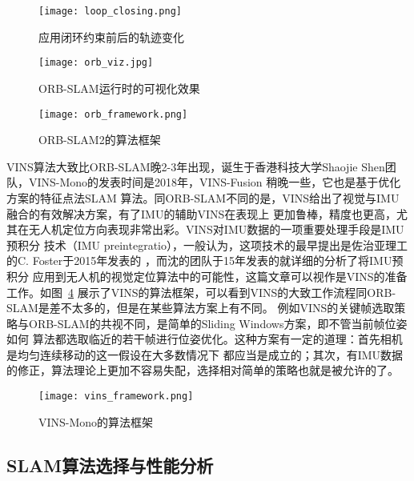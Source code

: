 \begin{figure}[h] %
  \centering
  \texttt{[image: loop\_closing.png]}
  \caption{应用闭环约束前后的轨迹变化}
  \label{fig:loop_closing}
\end{figure}


\begin{figure}[h] %
  \centering
  \texttt{[image: orb\_viz.jpg]}
  \caption{ORB-SLAM运行时的可视化效果}
  \label{fig:orb_viz}
\end{figure}

\begin{figure}[h] %
  \centering
  \texttt{[image: orb\_framework.png]}
  \caption{ORB-SLAM2的算法框架}
  \label{fig:orb_frame}
\end{figure}




VINS\cite{qin2018vins}算法大致比ORB-SLAM晚2-3年出现，诞生于香港科技大学Shaojie Shen团队，VINS-Mono的发表时间是2018年，VINS-Fusion
稍晚一些，它也是基于优化方案的特征点法SLAM
算法。同ORB-SLAM不同的是，VINS给出了视觉与IMU融合的有效解决方案，有了IMU的辅助VINS在表现上
更加鲁棒，精度也更高，尤其在无人机定位方向表现非常出彩。VINS对IMU数据的一项重要处理手段是IMU预积分
技术（IMU preintegratio），一般认为，这项技术的最早提出是佐治亚理工的C. Foster于2015年发表的
\cite{forster2015imu}，而沈的团队于15年发表的\cite{shen2015tightly}就详细的分析了将IMU预积分
应用到无人机的视觉定位算法中的可能性，这篇文章可以视作是VINS的准备工作。如图~\ref{fig:vins_frame}
展示了VINS的算法框架，可以看到VINS的大致工作流程同ORB-SLAM是差不太多的，但是在某些算法方案上有不同。
例如VINS的关键帧选取策略与ORB-SLAM的共视不同，是简单的Sliding Windows方案，即不管当前帧位姿如何
算法都选取临近的若干帧进行位姿优化。这种方案有一定的道理：首先相机是均匀连续移动的这一假设在大多数情况下
都应当是成立的；其次，有IMU数据的修正，算法理论上更加不容易失配，选择相对简单的策略也就是被允许的了。


\begin{figure}[h] %
  \centering
  \texttt{[image: vins\_framework.png]}
  \caption{VINS-Mono的算法框架}
  \label{fig:vins_frame}
\end{figure}

\subsection{SLAM算法选择与性能分析}


